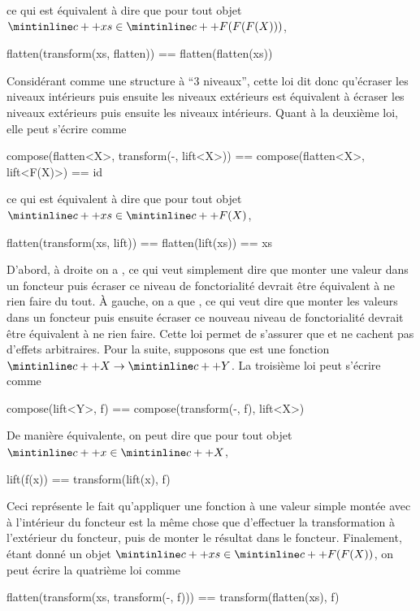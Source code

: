 ce qui est équivalent à dire que pour tout objet $\cc{xs} \in \cc{F(F(F(X)))}$,
\begin{cpp}
    flatten(transform(xs, flatten)) == flatten(flatten(xs))
\end{cpp}

Considérant  comme une structure à ``3 niveaux'', cette loi dit donc
qu'écraser les niveaux intérieurs puis ensuite les niveaux extérieurs est
équivalent à écraser les niveaux extérieurs puis ensuite les niveaux
intérieurs. Quant à la deuxième loi, elle peut s'écrire comme
\begin{cpp}
    compose(flatten<X>, transform(-, lift<X>))
        == compose(flatten<X>, lift<F(X)>)
        == id
\end{cpp}

ce qui est équivalent à dire que pour tout objet $\cc{xs} \in \cc{F(X)}$,
\begin{cpp}
    flatten(transform(xs, lift)) == flatten(lift(xs)) == xs
\end{cpp}

D'abord, à droite on a , ce qui veut simplement
dire que monter une valeur dans un foncteur puis écraser ce niveau de
fonctorialité devrait être équivalent à ne rien faire du tout. À gauche, on
a que , ce qui veut dire que monter
les valeurs dans un foncteur puis ensuite écraser ce nouveau niveau de
fonctorialité devrait être équivalent à ne rien faire. Cette loi permet
de s'assurer que  et  ne cachent pas d'effets arbitraires.
Pour la suite, supposons que  est une fonction $\cc{X} \to \cc{Y}$. La
troisième loi peut s'écrire comme
\begin{cpp}
    compose(lift<Y>, f) == compose(transform(-, f), lift<X>)
\end{cpp}

De manière équivalente, on peut dire que pour tout objet $\cc{x} \in \cc{X}$,
\begin{cpp}
    lift(f(x)) == transform(lift(x), f)
\end{cpp}

Ceci représente le fait qu'appliquer une fonction à une valeur simple montée
avec  à l'intérieur du foncteur est la même chose que d'effectuer
la transformation à l'extérieur du foncteur, puis de monter le résultat dans
le foncteur. Finalement, étant donné un objet $\cc{xs} \in \cc{F(F(X))}$, on
peut écrire la quatrième loi comme
\begin{cpp}
    flatten(transform(xs, transform(-, f))) == transform(flatten(xs), f)
\end{cpp}

